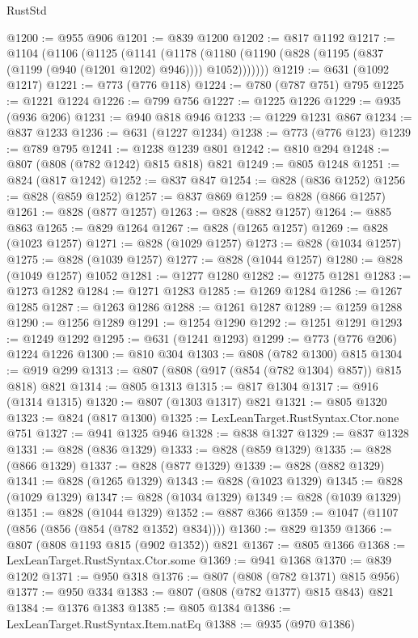 \begin{lexlean}{RustStd}
\begin{coremodule}
@1200 := @955 @906
@1201 := @839 @1200
@1202 := @817 @1192
@1217 := @1104
    (@1106
      (@1125
        (@1141
          (@1178 (@1180 (@1190 (@828 (@1195 (@837 (@1199 (@940 (@1201 @1202) @946)))) @1052)))))))
@1219 := @631 (@1092 @1217)
@1221 := @773 (@776 @118)
@1224 := @780 (@787 @751) @795
@1225 := @1221 @1224
@1226 := @799 @756
@1227 := @1225 @1226
@1229 := @935 (@936 @206)
@1231 := @940 @818 @946
@1233 := @1229 @1231 @867
@1234 := @837 @1233
@1236 := @631 (@1227 @1234)
@1238 := @773 (@776 @123)
@1239 := @789 @795
@1241 := @1238 @1239 @801
@1242 := @810 @294
@1248 := @807 (@808 (@782 @1242) @815 @818) @821
@1249 := @805 @1248
@1251 := @824 (@817 @1242)
@1252 := @837 @847
@1254 := @828 (@836 @1252)
@1256 := @828 (@859 @1252)
@1257 := @837 @869
@1259 := @828 (@866 @1257)
@1261 := @828 (@877 @1257)
@1263 := @828 (@882 @1257)
@1264 := @885 @863
@1265 := @829 @1264
@1267 := @828 (@1265 @1257)
@1269 := @828 (@1023 @1257)
@1271 := @828 (@1029 @1257)
@1273 := @828 (@1034 @1257)
@1275 := @828 (@1039 @1257)
@1277 := @828 (@1044 @1257)
@1280 := @828 (@1049 @1257) @1052
@1281 := @1277 @1280
@1282 := @1275 @1281
@1283 := @1273 @1282
@1284 := @1271 @1283
@1285 := @1269 @1284
@1286 := @1267 @1285
@1287 := @1263 @1286
@1288 := @1261 @1287
@1289 := @1259 @1288
@1290 := @1256 @1289
@1291 := @1254 @1290
@1292 := @1251 @1291
@1293 := @1249 @1292
@1295 := @631 (@1241 @1293)
@1299 := @773 (@776 @206) @1224 @1226
@1300 := @810 @304
@1303 := @808 (@782 @1300) @815
@1304 := @919 @299
@1313 := @807 (@808 (@917 (@854 (@782 @1304) @857)) @815 @818) @821
@1314 := @805 @1313
@1315 := @817 @1304
@1317 := @916 (@1314 @1315)
@1320 := @807 (@1303 @1317) @821
@1321 := @805 @1320
@1323 := @824 (@817 @1300)
@1325 := LexLeanTarget.RustSyntax.Ctor.none @751
@1327 := @941 @1325 @946
@1328 := @838 @1327
@1329 := @837 @1328
@1331 := @828 (@836 @1329)
@1333 := @828 (@859 @1329)
@1335 := @828 (@866 @1329)
@1337 := @828 (@877 @1329)
@1339 := @828 (@882 @1329)
@1341 := @828 (@1265 @1329)
@1343 := @828 (@1023 @1329)
@1345 := @828 (@1029 @1329)
@1347 := @828 (@1034 @1329)
@1349 := @828 (@1039 @1329)
@1351 := @828 (@1044 @1329)
@1352 := @887 @366
@1359 := @1047 (@1107 (@856 (@856 (@854 (@782 @1352) @834))))
@1360 := @829 @1359
@1366 := @807 (@808 @1193 @815 (@902 @1352)) @821
@1367 := @805 @1366
@1368 := LexLeanTarget.RustSyntax.Ctor.some
@1369 := @941 @1368
@1370 := @839 @1202
@1371 := @950 @318
@1376 := @807 (@808 (@782 @1371) @815 @956)
@1377 := @950 @334
@1383 := @807 (@808 (@782 @1377) @815 @843) @821
@1384 := @1376 @1383
@1385 := @805 @1384
@1386 := LexLeanTarget.RustSyntax.Item.natEq
@1388 := @935 (@970 @1386)

\end{coremodule}
\end{lexlean}
